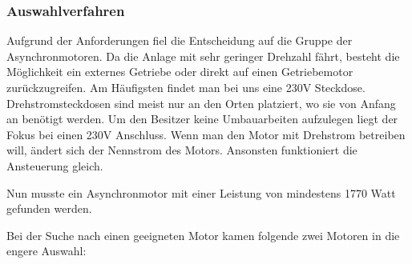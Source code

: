 \subsubsection{Auswahlverfahren}
\label{sec:auswahlverfahren}

Aufgrund der Anforderungen fiel die Entscheidung auf die Gruppe der Asynchronmotoren. Da die Anlage mit sehr geringer Drehzahl fährt, besteht die Möglichkeit ein externes Getriebe oder direkt auf einen Getriebemotor zurückzugreifen. 
Am Häufigsten findet man bei uns eine 230V Steckdose. Drehstromsteckdosen sind meist nur an den Orten platziert, wo sie von Anfang an benötigt werden. Um den Besitzer keine Umbauarbeiten aufzulegen liegt der Fokus bei einen 230V Anschluss. Wenn man den Motor mit Drehstrom betreiben will, ändert sich der Nennstrom des Motors. Ansonsten funktioniert die Ansteuerung gleich.

Nun musste ein Asynchronmotor mit einer Leistung von mindestens 1770 Watt gefunden werden.

Bei der Suche nach einen geeigneten Motor kamen folgende zwei Motoren in die engere Auswahl:

